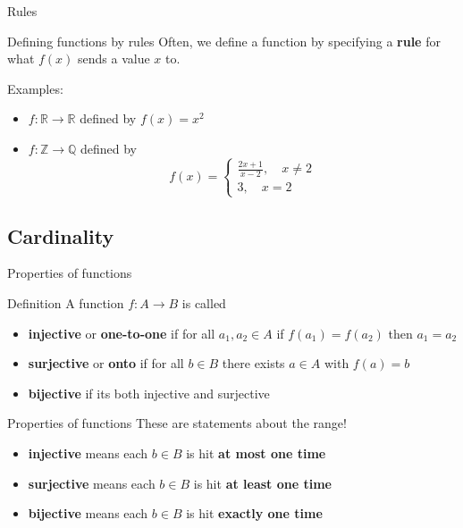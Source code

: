 \documentclass{beamer}
\begin{document}
\begin{frame}{Rules}
\begin{block}{Defining functions by rules}
Often, we define a function by specifying a \textbf{rule} for what $f(x)$ sends a value $x$ to.
\end{block}
\pause
Examples:
\begin{itemize}
\pause
\item $f: \mathbb R\rightarrow\mathbb R$ defined by $f(x) = x^2$
\pause
\item $f: \mathbb Z\rightarrow\mathbb Q$ defined by
$$f(x) = \left\lbrace\begin{array}{cc}\frac{2x+1}{x-2},\quad x\neq 2\\ 3,\quad x = 2\end{array}\right.$$
\end{itemize}
\end{frame}

\subsection{Cardinality}

\begin{frame}{Properties of functions}
\pause
\begin{block}{Definition}
A function $f: A\rightarrow B$ is called
\begin{itemize}
\pause
\item \textbf{injective} or \textbf{one-to-one} if for all $a_1,a_2\in A$ if $f(a_1) = f(a_2)$ then $a_1=a_2$
\pause
\item \textbf{surjective} or \textbf{onto} if for all $b\in B$ there exists $a\in A$ with $f(a) = b$
\pause
\item \textbf{bijective} if its both injective and surjective
\end{itemize}
\end{block}
\end{frame}

\begin{frame}{Properties of functions}
These are statements about the {\color{red}range}!
\pause
\begin{itemize}
\pause
\item \textbf{injective} means each $b\in B$ is hit \textbf{at most one time}
\pause
\item \textbf{surjective} means each $b\in B$ is hit \textbf{at least one time}
\pause
\item \textbf{bijective} means each $b\in B$ is hit \textbf{exactly one time}
\end{itemize}
\end{frame}
\end{document}
